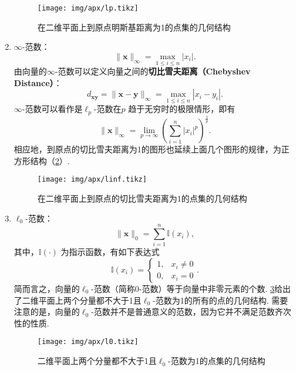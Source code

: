 \begin{enumerate}[leftmargin=0em, listparindent=2em, itemindent=2em]
          \begin{figure}[htb!]
              \centering
              \texttt{[image: img/apx/lp.tikz]}
              \caption{在二维平面上到原点明斯基距离为1的点集的几何结构}
              \label{fig_apx_lp}
          \end{figure}
    \item \( \infty \)-范数：
          \[
              \| \bm{x} \|_{\infty} = \max_{1 \leq i \leq n} |x_i|.
          \]
          由向量的\( \infty \)-范数可以定义向量之间的\textbf{切比雪夫距离（Chebyshev Distance）}：
          \[
              d_{\bm{x}\bm{y}} = \| \bm{x} - \bm{y} \|_{\infty} = \max_{1 \leq i \leq n} |x_i - y_i|.
          \]
          \( \infty \)-范数可以看作是\( \ell_p \)-范数在\( p\) 趋于无穷时的极限情形，即有
          \[
              \|\bm{x}\|_{\infty} = \lim_{p \to \infty} \left(\sum_{i=1}^n |x_i|^p\right)^{\frac{1}{p}}.
          \]
          相应地，到原点的切比雪夫距离为1的图形也延续上面几个图形的规律，为正方形结构（\cref{fig_apx_linf}）.
          \begin{figure}[htb!]
              \centering
              \texttt{[image: img/apx/linf.tikz]}
              \caption{在二维平面上到原点的切比雪夫距离为1的点集的几何结构}
              \label{fig_apx_linf}
          \end{figure}
    \item \( \ell_0 \)-范数：
          \[
              \| \bm{x} \|_0 = \sum_{i=1}^n \mathbb{I}(x_i),
          \]
          其中，\( \mathbb{I}(\cdot) \) 为指示函数，有如下表达式
          \[
              \mathbb{I}(x_i) = \begin{cases}
                  1, & x_i \neq 0 \\
                  0, & x_i = 0
              \end{cases}.
          \]
          简而言之，向量的\( \ell_0 \)-范数（简称0-范数）等于向量中非零元素的个数. \cref{fig_apx_l0}给出了二维平面上两个分量都不大于1且\( \ell_0 \)-范数为1的所有的点的几何结构. 需要注意的是，向量的\( \ell_0 \)-范数并不是普通意义的范数，因为它并不满足范数齐次性的性质.
          \begin{figure}[htb!]
              \centering
              \texttt{[image: img/apx/l0.tikz]}
              \caption{二维平面上两个分量都不大于1且\( \ell_0 \)-范数为1的点集的几何结构}
              \label{fig_apx_l0}
          \end{figure}
\end{enumerate}


